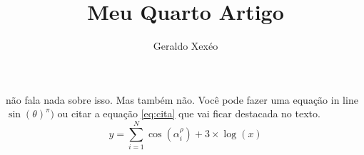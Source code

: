 \documentclass{article}
\title{Meu Quarto Artigo}
\author{Geraldo Xexéo}
\begin{document}
\maketitle
\citet{biber:2012} não fala nada sobre isso. Mas \citep{bibera2012} também não. Você pode fazer uma equação in line $\sin(\theta)^\pi)$ ou citar
a equação \ref{eq:cita} que vai ficar destacada no texto.
\begin{equation}\label{eq:cita}
  y = \sum^{N}_{i=1} \cos(\alpha_i^\rho)+3\times \log(x)
\end{equation}
\printbibliography       
\end{document}
